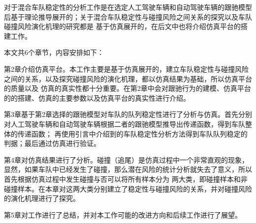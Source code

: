 对于混合车队稳定性的分析工作是在选定人工驾驶车辆和自动驾驶车辆的跟驰模型后基于理论推导展开的；关于混合车队稳定性与碰撞风险之间关系的探究以及车队碰撞风险演化机理的研究都是
基于仿真展开的，在后文中也将介绍仿真平台的搭建工作。

本文共6个章节，内容安排如下：

第2章介绍仿真平台。本工作主要是基于仿真展开的，建立车队稳定性与碰撞风险之间的关系，以及探究碰撞风险的演化机理，都以仿真结果为基础，所以仿真平台的质量以及
仿真的真实性都十分重要。在第2章中会对跟驰行为的建模、仿真平台的的搭建、仿真的主要参数以及仿真平台的真实性进行介绍。

第3章基于第2章选择的跟驰模型对车队的队列稳定性进行了分析与仿真。首先分别对人工驾驶车辆和自动驾驶车辆根据二者的跟驰模型推导出传递函数，得到车队整体的传递函数；
再使用引言中介绍到的车队稳定性分析方法得到车队队列稳定的判据；最后通过仿真进行验证。

第4章对仿真结果进行了分析。碰撞（追尾）是仿真过程中一个非常直观的现象，显然，如果车队中已经发生了碰撞，那么潜在风险的统计分析就失去了意义，所以首先根据仿真过程中发生碰撞与否可以将所有样本分为
两大类，即碰撞样本和非碰撞样本。在本章对这两大类分别建立了稳定性与碰撞风险的关系，并对碰撞风险的演化机理进行了探究。

第5章对工作进行了总结，并对本工作可能的改进方向和后续工作进行了展望。


